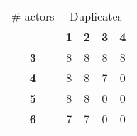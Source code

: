 \begin{tabular}{ | c | c | c | c | c | }
\hline
\# actors & \multicolumn{4}{|c|}{Duplicates} \\ \cline{2-5}
 & {\bf1} & {\bf2} & {\bf3} & {\bf4} \\ \hline
{\bf 3} & 8 & 8 & 8 & 8 \\ \hline
{\bf 4} & 8 & 8 & 7 & 0 \\ \hline
{\bf 5} & 8 & 8 & 0 & 0 \\ \hline
{\bf 6} & 7 & 7 & 0 & 0 \\ \hline
\end{tabular}
